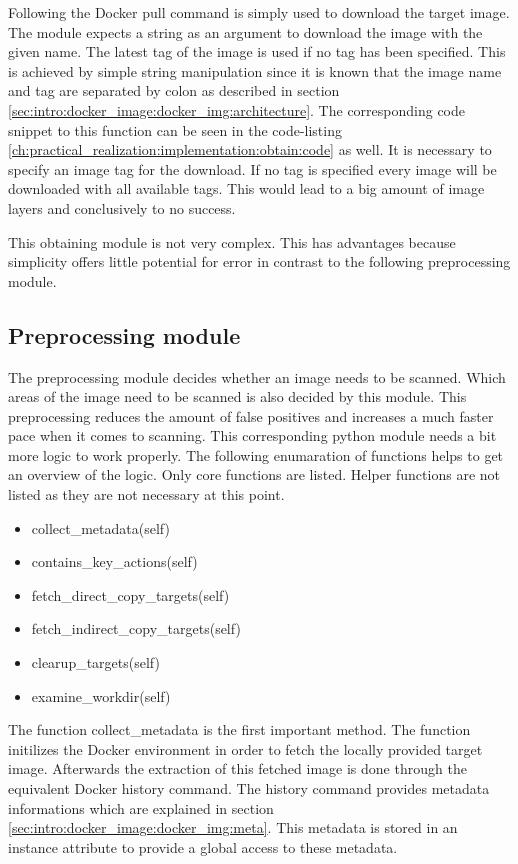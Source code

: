 Following the Docker pull command is simply used to download the target image. 
The module expects a string as an argument to download the image with the given name.
The latest tag of the image is used if no tag has been specified. 
This is achieved by simple string manipulation since it is known that the image name and tag are separated by colon as described in section \ref{sec:intro:docker_image:docker_img:architecture}.
The corresponding code snippet to this function can be seen in the code-listing \ref{ch:practical_realization:implementation:obtain:code} as well.
It is necessary to specify an image tag for the download.
If no tag is specified every image will be downloaded with all available tags.
This would lead to a big amount of image layers and conclusively to no success.

This obtaining module is not very complex. 
This has advantages because simplicity offers little potential for error in contrast to the following preprocessing module.

\subsection{Preprocessing module}
\label{ch:practical_realization:implementation:preprocessing}
The preprocessing module decides whether an image needs to be scanned. Which areas of the image need to be scanned is also decided by this module.
This preprocessing reduces the amount of false positives and increases a much faster pace when it comes to scanning.	
This corresponding python module needs a bit more logic to work properly. 
The following enumaration of functions helps to get an overview of the logic. 
Only core functions are listed.
Helper functions are not listed as they are not necessary at this point.
\begin{itemize}
\item collect\_metadata(self)
\item contains\_key\_actions(self)
\item fetch\_direct\_copy\_targets(self)
\item fetch\_indirect\_copy\_targets(self)
\item clearup\_targets(self)
\item examine\_workdir(self)
\end{itemize}
The function collect\_metadata is the first important method. 
The function initilizes the Docker environment in order to fetch the locally provided target image. 
Afterwards the extraction of this fetched image is done through the equivalent Docker history command. 
The history command provides metadata informations which are explained in section \ref{sec:intro:docker_image:docker_img:meta}. 
This metadata is stored in an instance attribute to provide a global access to these metadata.

